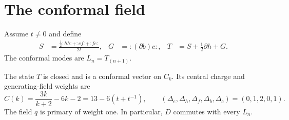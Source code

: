 \section{The conformal field}

Assume $t\neq0$ and define
\begin{align}
 S&=\frac{\frac12:hh:+:ef:+:fe:}{2t},
 &G&=:(\partial b)c:,
 &T&=S+\frac12\partial h+G.\label{eq:ds-stress}
\end{align}
The conformal modes are $L_n=T_{(n+1)}$.

\begin{proposition}\label{prop:closed-stress}
The state $T$ is closed and is a conformal vector on $C_k$.
Its central charge and generating-field weights are
\begin{equation}\label{eq:ds-central}
 C(k)=\frac{3k}{k+2}-6k-2
      =13-6(t+t^{-1}),
 \qquad (\Delta_e,\Delta_h,\Delta_f,\Delta_b,\Delta_c)=(0,1,2,0,1).
\end{equation}
The field $q$ is primary of weight one.
In particular, $D$ commutes with every $L_n$.
\end{proposition}


